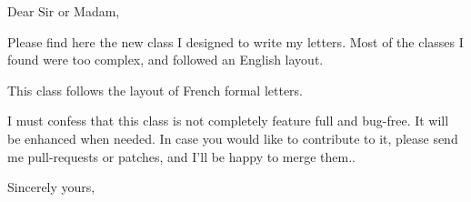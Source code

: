 \documentclass[12pt]{frenchletter}
\date{\today}
\begin{document}
    \opening{Dear Sir or Madam,}
    
    Please find here the new class I designed to write my letters. Most of the classes I found were too complex, and followed an English layout.
    
    This class follows the layout of French formal letters.
    
    I must confess that this class is not completely feature full and bug-free. It will be enhanced when needed. In case you would like to contribute to it, please send me pull-requests or patches, and I'll be happy to merge them..
    
    \closing{Sincerely yours,}
    
    
\end{document}
